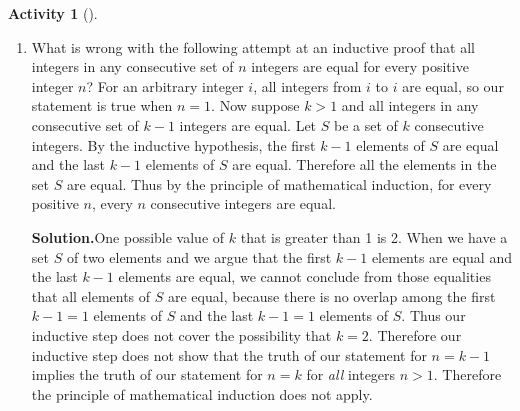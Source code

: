 \documentclass[10pt,]{book}
\theoremstyle{plain}
\theoremstyle{definition}
\newtheorem{activity}[project]{Activity}
\numberwithin{equation}{chapter}
\begin{document}
\begin{activity}[]
\begin{enumerate}[label=(\alph*)]
~\par
\item What is wrong with the following attempt at an inductive proof that all integers in any consecutive set of \(n\) integers are equal for every positive integer \(n\)? For an arbitrary integer \(i\), all integers from \(i\) to \(i\) are equal, so our statement is true when \(n=1\). Now suppose \(k>1\) and all integers in any consecutive set of \(k-1\) integers are equal. Let \(S\) be a set of \(k\) consecutive integers. By the inductive hypothesis, the first \(k-1\) elements of \(S\) are equal and the last \(k-1\) elements of \(S\) are equal. Therefore all the elements in the set \(S\) are equal. Thus by the principle of mathematical induction, for every positive \(n\), every \(n\) consecutive integers are equal.%
\par\medskip\noindent%
\textbf{Solution.}\quad One possible value of \(k\) that is greater than 1 is 2. When we have a set \(S\) of two elements and we argue that the first \(k-1\) elements are equal and the last \(k-1\) elements are equal, we cannot conclude from those equalities that all elements of \(S\) are equal, because there is no overlap among the first \(k-1=1\) elements of \(S\) and the last \(k-1=1\) elements of \(S\). Thus our inductive step does not cover the possibility that \(k=2\). Therefore our inductive step does not show that the truth of our statement for \(n=k-1\) implies the truth of our statement for \(n=k\) for \emph{all} integers \(n>1\). Therefore the principle of mathematical induction does not apply.%

\end{enumerate}
\end{activity}
\typeout{************************************************}
\typeout{************************************************}
\end{document}
